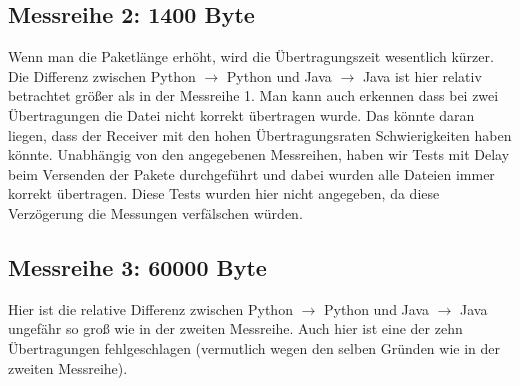 \documentclass{article}
\begin{document}
    \subsection{Messreihe 2: 1400 Byte}\label{subsec:messreihe-2:-1400-byte}
    Wenn man die Paketlänge erhöht, wird die Übertragungszeit wesentlich kürzer.
    Die Differenz zwischen Python $\rightarrow$ Python und Java $\rightarrow$ Java ist hier relativ betrachtet größer als in der Messreihe 1.
    Man kann auch erkennen dass bei zwei Übertragungen die Datei nicht korrekt übertragen wurde.
    Das könnte daran liegen, dass der Receiver mit den hohen Übertragungsraten Schwierigkeiten haben könnte.
    Unabhängig von den angegebenen Messreihen, haben wir Tests mit Delay beim Versenden der Pakete durchgeführt und dabei wurden alle Dateien immer korrekt übertragen.
    Diese Tests wurden hier nicht angegeben, da diese Verzögerung die Messungen verfälschen würden.

    \subsection{Messreihe 3: 60000 Byte}\label{subsec:messreihe-2:-60000-byte}
    Hier ist die relative Differenz zwischen Python $\rightarrow$ Python und Java $\rightarrow$ Java ungefähr so groß wie in der zweiten Messreihe.
    Auch hier ist eine der zehn Übertragungen fehlgeschlagen (vermutlich wegen den selben Gründen wie in der zweiten Messreihe).
\end{document}
